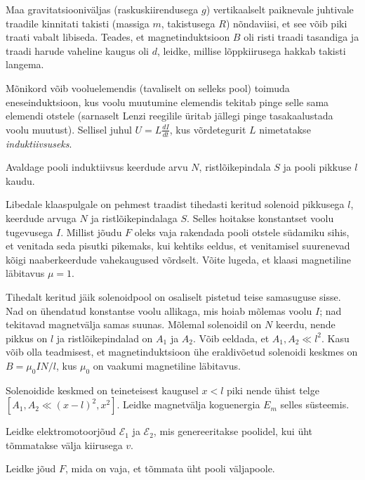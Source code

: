 \documentclass[a4paper,11pt,twocolumn]{article}
\begin{document}
\begin{question}[Piirk 2011, G8]
    Maa gravitatsiooniväljas (raskuskiirendusega $g$) vertikaalselt paiknevale juhtivale traadile kinnitati takisti (massiga $m$, takistusega $R$) nõndaviisi, et see võib piki traati vabalt libiseda. Teades, et magnetinduktsioon $B$ oli risti traadi tasandiga ja traadi harude vaheline kaugus oli $d$, leidke, millise lõppkiirusega hakkab takisti langema.
\end{question}

Mõnikord võib vooluelemendis (tavaliselt on selleks pool) toimuda eneseinduktsioon, kus voolu muutumine elemendis tekitab pinge selle sama elemendi otstele (sarnaselt Lenzi reegilile üritab jällegi pinge tasakaalustada voolu muutust). Sellisel juhul $U=L\frac{dI}{dt}$, kus võrdetegurit $L$ nimetatakse \textit{induktiivsuseks}.

Avaldage pooli induktiivsus keerdude arvu $N$, ristlõikepindala $S$ ja pooli pikkuse $l$ kaudu.

\begin{question}[Lõppv 2008, G10]
    Libedale klaaspulgale on pehmest traadist tihedasti keritud solenoid pikkusega $l$, keerdude arvuga $N$ ja ristlõikepindalaga $S$. Selles hoitakse konstantset voolu tugevusega $I$. Millist jõudu $F$ oleks vaja rakendada pooli otstele südamiku sihis, et venitada seda pisutki pikemaks, kui kehtiks eeldus, et venitamisel suurenevad kõigi naaberkeerdude vahekaugused võrdselt. Võite lugeda, et klaasi magnetiline läbitavus $\mu = 1$.
\end{question}

\begin{question}[E-S 2015, P9]
    Tihedalt keritud jäik solenoidpool on osaliselt pistetud teise samasuguse sisse. Nad on ühendatud konstantse voolu allikaga, mis hoiab mõlemas voolu $I$; nad tekitavad magnetvälja samas suunas. Mõlemal solenoidil on $N$ keerdu, nende pikkus on $l$ ja ristlõikepindalad on $A_1$ ja $A_2$. Võib eeldada, et $A_1,A_2 \ll l^{2}$. Kasu võib olla teadmisest, et magnetinduktsioon ühe eraldivõetud solenoidi keskmes on $B = \mu_0 IN/l$, kus $\mu_0$ on vaakumi magnetiline läbitavus.
    \begin{subquestion}
    \item Solenoidide keskmed on teineteisest kaugusel $x < l$ piki nende ühist telge \( [A_1, A_2 \ll (x - l)^{2}, x^{2}] \). Leidke magnetvälja koguenergia $E_m$ selles süsteemis.
    \item Leidke elektromotoorjõud $\mathcal{E}_1$ ja $\mathcal{E}_2$, mis genereeritakse poolidel, kui üht tõmmatakse välja kiirusega $v$.
    \item Leidke jõud $F$, mida on vaja, et tõmmata üht pooli väljapoole.
    \end{subquestion}
\end{question}
\end{document}
